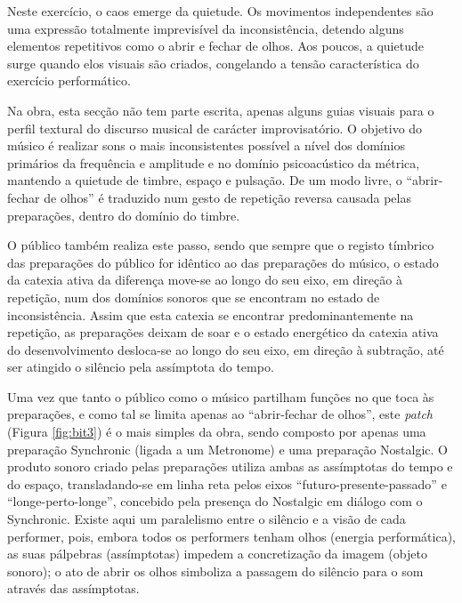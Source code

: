 \documentclass[../main.tex]{subfiles}
\begin{document}
Neste exercício, o caos emerge da quietude. Os movimentos independentes são uma expressão totalmente imprevisível da inconsistência, detendo alguns elementos repetitivos como o abrir e fechar de olhos. Aos poucos, a quietude surge quando elos visuais são criados, congelando a tensão característica do exercício performático.

Na obra, esta secção não tem parte escrita, apenas alguns guias visuais para o perfil textural do discurso musical de carácter improvisatório. O objetivo do músico é realizar sons o mais inconsistentes possível a nível dos domínios primários da frequência e amplitude e no domínio psicoacústico da métrica, mantendo a quietude de timbre, espaço e pulsação. De um modo livre, o \enquote{abrir-fechar de olhos} é traduzido num gesto de repetição reversa causada pelas preparações, dentro do domínio do timbre.

O público também realiza este passo, sendo que sempre que o registo tímbrico das preparações do público for idêntico ao das preparações do músico, o estado da catexia ativa da diferença move-se ao longo do seu eixo, em direção à repetição, num dos domínios sonoros que se encontram no estado de inconsistência. Assim que esta catexia se encontrar predominantemente na repetição, as preparações deixam de soar e o estado energético da catexia ativa do desenvolvimento desloca-se ao longo do seu eixo, em direção à subtração, até ser atingido o silêncio pela assímptota do tempo.

Uma vez que tanto o público como o músico partilham funções no que toca às preparações, e como tal se limita apenas ao \enquote{abrir-fechar de olhos}, este \textsl{patch} (Figura \ref{fig:bit3}) é o mais simples da obra, sendo composto por apenas uma preparação Synchronic (ligada a um Metronome) e uma preparação Nostalgic. O produto sonoro criado pelas preparações utiliza ambas as assímptotas do tempo e do espaço, transladando-se em linha reta pelos eixos \enquote{futuro-presente-passado} e \enquote{longe-perto-longe}, concebido pela presença do Nostalgic em diálogo com o Synchronic. Existe aqui um paralelismo entre o silêncio e a visão de cada performer, pois, embora todos os performers tenham olhos (energia performática), as suas pálpebras (assímptotas) impedem a concretização da imagem (objeto sonoro); o ato de abrir os olhos simboliza a passagem do silêncio para o som através das assímptotas.
\end{document}
